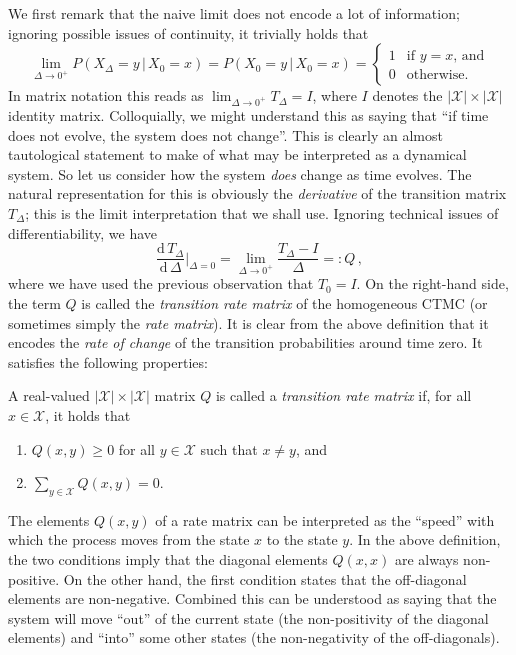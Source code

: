 \documentclass[graybox]{svmult}
\newcommand{\states}{\mathcal{X}}
\begin{document}
We first remark that the naive limit does not encode a lot of information; ignoring possible issues of continuity, it trivially holds that
\begin{equation}\label{eq:time_zero_is_id}
\lim_{\Delta\to 0^+} P(X_{\Delta}=y\,\vert\,X_0=x) = P(X_0=y\,\vert\,X_0=x) = \begin{cases}
1 & \text{if $y=x$, and} \\
0 & \text{otherwise.}
\end{cases}
\end{equation}
In matrix notation this reads as $\lim_{\Delta\to0^+}T_\Delta = I$, where $I$ denotes the $\lvert\states\rvert\times \lvert\states\rvert$ identity matrix. Colloquially, we might understand this as saying that ``if time does not evolve, the system does not change''. This is clearly an almost tautological statement to make of what may be interpreted as a dynamical system. So let us consider how the system \emph{does} change as time evolves. The natural representation for this is obviously the \emph{derivative} of the transition matrix $T_\Delta$; this is the limit interpretation that we shall use. Ignoring technical issues of differentiability, we have
\begin{equation}\label{eq:rate_mat_is_deriv}
\frac{\mathrm{d}\,T_\Delta}{\mathrm{d}\,\Delta}\bigg\vert_{\Delta=0} = \lim_{\Delta\to0^+}\frac{T_\Delta - I}{\Delta} =: Q\,,
\end{equation}
where we have used the previous observation that $T_0=I$. On the right-hand side, the term $Q$ is called the \emph{transition rate matrix} of the homogeneous CTMC (or sometimes simply the \emph{rate matrix}). It is clear from the above definition that it encodes the \emph{rate of change} of the transition probabilities around time zero. It satisfies the following properties:
\begin{definition}\label{def:trans_rate_matrix}
A real-valued $\lvert\states\rvert\times\lvert\states\rvert$ matrix $Q$ is called a \emph{transition rate matrix} if, for all $x\in\states$, it holds that
\begin{enumerate}
\item $Q(x,y)\geq 0$ for all $y\in\states$ such that $x\neq y$, and
\item $\sum_{y\in\states}Q(x,y)=0$.
\end{enumerate}
\end{definition}
The elements $Q(x,y)$ of a rate matrix can be interpreted as the ``speed'' with which the process moves from the state $x$ to the state $y$. In the above definition, the two conditions imply that the diagonal elements $Q(x,x)$ are always non-positive. On the other hand, the first condition states that the off-diagonal elements are non-negative. Combined this can be understood as saying that the system will move ``out'' of the current state (the non-positivity of the diagonal elements) and ``into'' some other states (the non-negativity of the off-diagonals).
\end{document}
